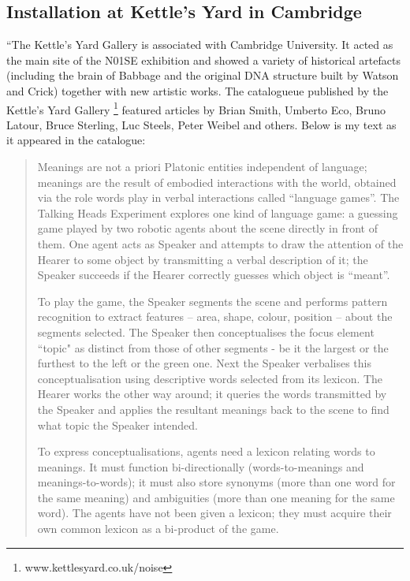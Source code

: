 \subsection{Installation at Kettle's Yard in Cambridge} 

``The Kettle's Yard Gallery is associated with Cambridge University. It acted as the main site of the N01SE exhibition 
and showed a variety of historical artefacts (including the brain of Babbage and the original DNA structure built by 
Watson and Crick) together with new artistic works. The catalogueue published by the Kettle's Yard 
Gallery \footnote{www.kettlesyard.co.uk/noise} featured articles by Brian Smith, Umberto Eco, Bruno Latour, 
Bruce Sterling, Luc Steels, Peter Weibel and others. Below is my text as it appeared in the catalogue: 
\begin{quotation}
Meanings are not a priori Platonic entities independent of language; meanings are the result of embodied interactions with the world, obtained via the role words play in verbal interactions called ``language games''. The Talking Heads Experiment explores one kind of language game: a guessing game played by two robotic agents about the scene directly in front of them. One agent acts as Speaker and attempts to draw the attention of the Hearer to some object by transmitting a verbal description of it; the Speaker succeeds if the Hearer correctly guesses which object is ``meant''.

To play the game, the Speaker segments the scene and performs pattern recognition to extract features -- area, shape, colour, position -- about the segments selected. The Speaker then conceptualises the focus element ``topic" as distinct from those of other segments - be it the largest or the furthest to the left or the green one. Next the Speaker verbalises this conceptualisation using descriptive words selected from its lexicon. The Hearer works the other way around; it queries the words transmitted by the Speaker and applies the resultant meanings back to the scene to find what topic the Speaker intended.

To express conceptualisations, agents need a lexicon relating words to meanings. It must function 
bi-directionally (words-to-meanings and meanings-to-words); it must also store synonyms (more than one word for the same meaning) and ambiguities (more than one meaning for the same word). The agents have not been given a lexicon; they must acquire their own common lexicon as a bi-product of the game.


\end{quotation}
